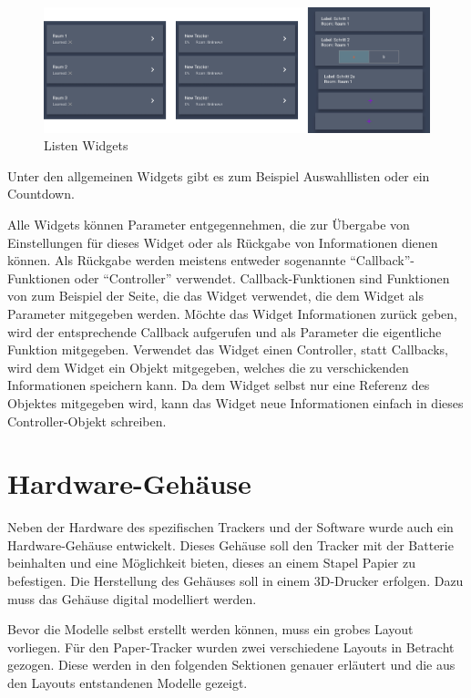 \begin{figure}[]
	\includegraphics[width=\textwidth]{images/app_lists.png}
	\centering
	\caption{Listen Widgets}
	\label{fig:app_lists}
\end{figure}

Unter den allgemeinen Widgets gibt es zum Beispiel Auswahllisten oder ein Countdown.

Alle Widgets können Parameter entgegennehmen, die zur Übergabe von Einstellungen für dieses Widget oder als Rückgabe
von Informationen dienen können.
Als Rückgabe werden meistens entweder sogenannte \enquote{Callback}-Funktionen oder \enquote{Controller} verwendet.
Callback-Funktionen sind Funktionen von zum Beispiel der Seite, die das Widget verwendet, die dem Widget als Parameter
mitgegeben werden.
Möchte das Widget Informationen zurück geben, wird der entsprechende Callback aufgerufen und als Parameter die eigentliche
Funktion mitgegeben.
Verwendet das Widget einen Controller, statt Callbacks, wird dem Widget ein Objekt mitgegeben, welches die zu verschickenden
Informationen speichern kann.
Da dem Widget selbst nur eine Referenz des Objektes mitgegeben wird, kann das Widget neue Informationen einfach in dieses
Controller-Objekt schreiben.

\section{Hardware-Gehäuse}

Neben der Hardware des spezifischen Trackers und der Software wurde auch ein Hardware-Gehäuse entwickelt.
Dieses Gehäuse soll den Tracker mit der Batterie beinhalten und eine Möglichkeit bieten, dieses an einem Stapel Papier zu befestigen.
Die Herstellung des Gehäuses soll in einem 3D-Drucker erfolgen.
Dazu muss das Gehäuse digital modelliert werden.

Bevor die Modelle selbst erstellt werden können, muss ein grobes Layout vorliegen.
Für den Paper-Tracker wurden zwei verschiedene Layouts in Betracht gezogen.
Diese werden in den folgenden Sektionen genauer erläutert und die aus den Layouts entstandenen Modelle gezeigt.

